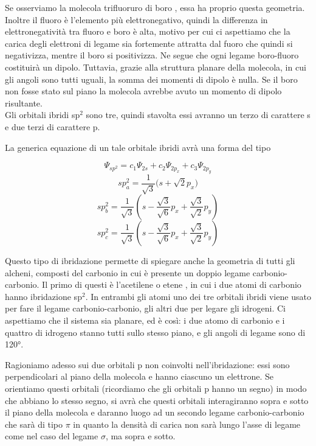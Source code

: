 Se osserviamo la molecola trifluoruro di boro , essa ha proprio questa geometria. Inoltre il fluoro è l'elemento più elettronegativo, quindi la differenza in elettronegatività tra fluoro e boro è alta, motivo per cui ci aspettiamo che la carica degli elettroni di legame sia fortemente attratta dal fuoro che quindi si negativizza, mentre il boro si positivizza. Ne segue che ogni legame boro-fluoro costituirà un dipolo. Tuttavia, grazie alla struttura planare della molecola, in cui gli angoli sono tutti uguali, la somma dei momenti di dipolo è nulla. Se il boro non fosse stato sul piano la molecola avrebbe avuto un momento di dipolo risultante.\\

Gli orbitali ibridi sp$^2$ sono tre, quindi stavolta essi avranno un terzo di carattere s e due terzi di carattere p.

La generica equazione di un tale orbitale ibridi avrà una forma del tipo

$$\Psi_{sp^2}=c_1\Psi_{2s} + c_2\Psi_{2p_x} + c_3\Psi_{2p_y}$$
$$sp^2_a=\frac{1}{\sqrt{3}}\Biggl(s + \sqrt{2}p_x\Biggr)
$$
$$
sp^2_b=\frac{1}{\sqrt{3}}\left(s - \frac{\sqrt{3}}{\sqrt{6}}p_x +\frac{\sqrt{3}}{\sqrt{2}}p_y\right)
$$
$$
sp^2_c=\frac{1}{\sqrt{3}}\left(s - \frac{\sqrt{3}}{\sqrt{6}}p_x + \frac{\sqrt{3}}{\sqrt{2}}p_y\right)
$$

Questo tipo di ibridazione permette di spiegare anche la geometria di tutti gli alcheni, composti del carbonio in cui è presente un doppio legame carbonio-carbonio. Il primo di questi è l'acetilene o etene , in cui i due atomi di carbonio hanno ibridazione sp$^2$. In entrambi gli atomi uno dei tre orbitali ibridi viene usato per fare il legame carbonio-carbonio, gli altri due per legare gli idrogeni. Ci aspettiamo che il sistema  sia planare, ed è così: i due atomo di carbonio e i quattro di idrogeno stanno tutti sullo stesso piano, e gli angoli di legame sono di 120°.

Ragioniamo adesso sui due orbitali p non coinvolti nell'ibridazione: essi sono perpendicolari al piano della molecola e hanno ciascuno un elettrone. Se orientiamo questi orbitali (ricordiamo che gli orbitali p hanno un segno) in modo che abbiano lo stesso segno, si avrà che questi orbitali interagiranno sopra e sotto il piano della molecola e daranno luogo ad un secondo legame carbonio-carbonio che sarà di tipo $\pi$ in quanto la densità di carica non sarà lungo l'asse di legame come nel caso del legame $\sigma$, ma sopra e sotto.


